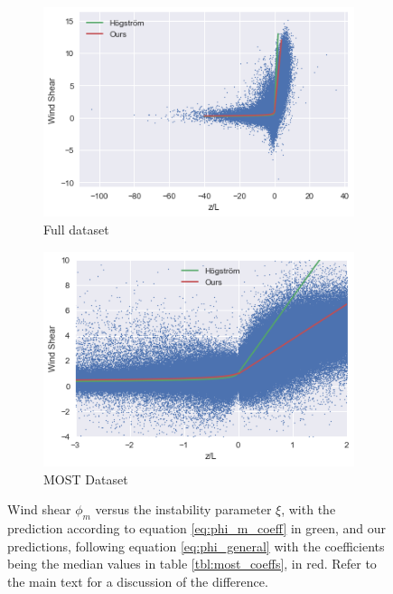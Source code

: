 \documentclass[a4paper]{book}
\begin{document}
\begin{figure}
    \centering
    \begin{subfigure}[t]{0.49\textwidth}
        \centering
        \includegraphics[width=\textwidth]{images/most_full}
        \caption{Full dataset}
        \label{fig:most_full}
    \end{subfigure}
    \hfill
    \begin{subfigure}[t]{0.49\textwidth}
        \centering
        \includegraphics[width=\textwidth]{images/most_zoom}
        \caption{MOST Dataset}
        \label{fig:most_zoom}
    \end{subfigure}
    \caption{Wind shear $\phi_m$ versus the instability parameter $\xi$, with the prediction according to equation \ref{eq:phi_m_coeff} in green, and our predictions, following equation \ref{eq:phi_general} with the coefficients being the median values in table \ref{tbl:most_coeffs}, in red. Refer to the main text for a discussion of the difference.}
	\label{fig:most_scatter}
\end{figure}
\end{document}
